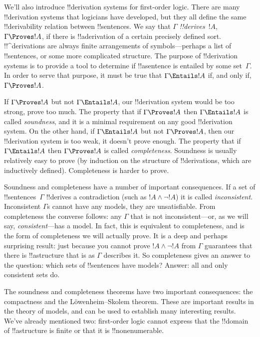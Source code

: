 \documentclass[../../../include/open-logic-section]{subfiles}
\begin{document}

We'll also introduce !!{derivation} systems for first-order logic.  There are
many !!{derivation} systems that logicians have developed, but they all define
the same !!{derivability} relation between !!{sentence}s. We say that
$\Gamma$ \emph{!!{derive}s}~$!A$, $\Gamma \Proves !A$, if there is
!!a{derivation} of a certain precisely defined sort. !!^{derivation}s
are always finite arrangements of symbols---perhaps a list of
!!{sentence}s, or some more complicated structure.  The purpose of
!!{derivation} systems is to provide a tool to determine if !!a{sentence} is
entailed by some set~$\Gamma$.  In order to serve that purpose, it
must be true that $\Gamma \Entails !A$ if, and only if, $\Gamma
\Proves !A$.

If $\Gamma \Proves !A$ but not $\Gamma \Entails !A$, our !!{derivation} system
would be too strong, prove too much.  The property that if $\Gamma
\Proves !A$ then $\Gamma \Entails !A$ is called \emph{soundness}, and
it is a minimal requirement on any good !!{derivation} system. On the other
hand, if $\Gamma \Entails !A$ but not $\Gamma \Proves !A$, then our
!!{derivation} system is too weak, it doesn't prove enough.  The property that
if $\Gamma \Entails !A$ then $\Gamma \Proves !A$ is called
\emph{completeness}. Soundness is usually relatively easy to prove (by
induction on the structure of !!{derivation}s, which are inductively
defined). Completeness is harder to prove.

Soundness and completeness have a number of important consequences. If
a set of !!{sentence}s~$\Gamma$ !!{derive}s a contradiction (such as
$!A \land \lnot !A$) it is called \emph{inconsistent}. Inconsistent
$\Gamma$s cannot have any models, they are unsatisfiable. From
completeness the converse follows: any $\Gamma$ that is not
inconsistent---or, as we will say, \emph{consistent}---has a model. In
fact, this is equivalent to completeness, and is the form of
completeness we will actually prove.  It is a deep and perhaps
surprising result: just because you cannot prove $!A \land \lnot !A$
from $\Gamma$ guarantees that there is !!a{structure} that is as
$\Gamma$ describes it.  So completeness gives an answer to the
question: which sets of !!{sentence}s have models? Answer: all and only
consistent sets do.

The soundness and completeness theorems have two important
consequences: the compactness and the L\"owenheim--Skolem theorem.
These are important results in the theory of models, and can be used
to establish many interesting results. We've already mentioned two:
first-order logic cannot express that the !!{domain} of !!a{structure}
is finite or that it is !!{nonenumerable}.
\end{document}
